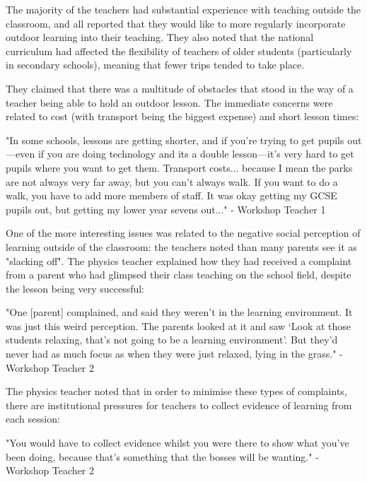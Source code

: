 The majority of the teachers had substantial experience with teaching outside the classroom, and all reported that they would like to more regularly incorporate outdoor learning into their teaching. They also noted that the national curriculum had affected the flexibility of teachers of older students (particularly in secondary schools), meaning that fewer trips tended to take place. 

They claimed that there was a multitude of obstacles that stood in the way of a teacher being able to hold an outdoor lesson. The immediate concerns were related to cost (with transport being the biggest expense) and short lesson times:

\begin{displayquote}
 "In some schools, lessons are getting shorter, and if you're trying to get pupils out---even if you are doing technology and its a double lesson---it's very hard to get pupils where you want to get them.  Transport costs... because I mean the parks are not always very far away, but you can't always walk. If you want to do a walk, you have to add more members of staff. It was okay getting my GCSE pupils out, but getting my lower year sevens out..." - Workshop Teacher 1
\end{displayquote}

One of the more interesting issues was related to the negative social perception of learning outside of the classroom: the teachers noted than many parents see it as "slacking off". The physics teacher explained how they had received a complaint from a parent who had glimpsed their class teaching on the school field, despite the lesson being very successful:

\begin{displayquote}
"One [parent] complained, and said they weren't in the learning environment. It was just this weird perception. The parents looked at it and saw ‘Look at those students relaxing, that’s not going to be a learning environment’. But they'd never had as much focus as when they were just relaxed, lying in the grass." - Workshop Teacher 2
\end{displayquote}

The physics teacher noted that in order to minimise these types of complaints, there are institutional pressures for teachers to collect evidence of learning from each session:

\begin{displayquote}
"You would have to collect evidence whilst you were there to show what you've been doing, because that's something that the bosses will be wanting." - Workshop Teacher 2
\end{displayquote}

